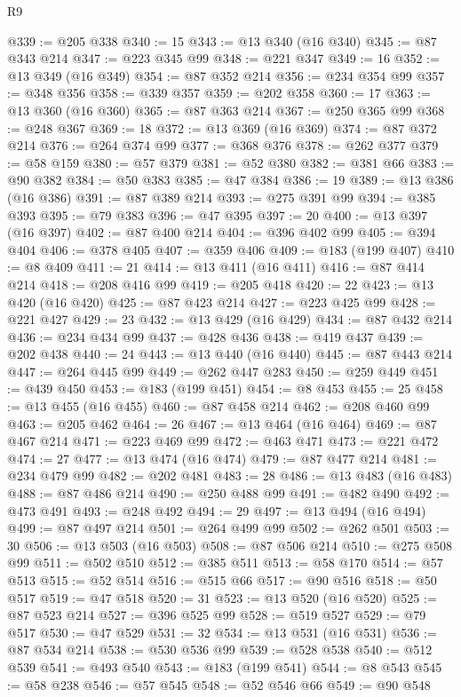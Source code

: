 \begin{lexlean}{R9}
\begin{coremodule}
@339 := @205 @338
@340 := 15
@343 := @13 @340 (@16 @340)
@345 := @87 @343 @214
@347 := @223 @345 @99
@348 := @221 @347
@349 := 16
@352 := @13 @349 (@16 @349)
@354 := @87 @352 @214
@356 := @234 @354 @99
@357 := @348 @356
@358 := @339 @357
@359 := @202 @358
@360 := 17
@363 := @13 @360 (@16 @360)
@365 := @87 @363 @214
@367 := @250 @365 @99
@368 := @248 @367
@369 := 18
@372 := @13 @369 (@16 @369)
@374 := @87 @372 @214
@376 := @264 @374 @99
@377 := @368 @376
@378 := @262 @377
@379 := @58 @159
@380 := @57 @379
@381 := @52 @380
@382 := @381 @66
@383 := @90 @382
@384 := @50 @383
@385 := @47 @384
@386 := 19
@389 := @13 @386 (@16 @386)
@391 := @87 @389 @214
@393 := @275 @391 @99
@394 := @385 @393
@395 := @79 @383
@396 := @47 @395
@397 := 20
@400 := @13 @397 (@16 @397)
@402 := @87 @400 @214
@404 := @396 @402 @99
@405 := @394 @404
@406 := @378 @405
@407 := @359 @406
@409 := @183 (@199 @407)
@410 := @8 @409
@411 := 21
@414 := @13 @411 (@16 @411)
@416 := @87 @414 @214
@418 := @208 @416 @99
@419 := @205 @418
@420 := 22
@423 := @13 @420 (@16 @420)
@425 := @87 @423 @214
@427 := @223 @425 @99
@428 := @221 @427
@429 := 23
@432 := @13 @429 (@16 @429)
@434 := @87 @432 @214
@436 := @234 @434 @99
@437 := @428 @436
@438 := @419 @437
@439 := @202 @438
@440 := 24
@443 := @13 @440 (@16 @440)
@445 := @87 @443 @214
@447 := @264 @445 @99
@449 := @262 @447 @283
@450 := @259 @449
@451 := @439 @450
@453 := @183 (@199 @451)
@454 := @8 @453
@455 := 25
@458 := @13 @455 (@16 @455)
@460 := @87 @458 @214
@462 := @208 @460 @99
@463 := @205 @462
@464 := 26
@467 := @13 @464 (@16 @464)
@469 := @87 @467 @214
@471 := @223 @469 @99
@472 := @463 @471
@473 := @221 @472
@474 := 27
@477 := @13 @474 (@16 @474)
@479 := @87 @477 @214
@481 := @234 @479 @99
@482 := @202 @481
@483 := 28
@486 := @13 @483 (@16 @483)
@488 := @87 @486 @214
@490 := @250 @488 @99
@491 := @482 @490
@492 := @473 @491
@493 := @248 @492
@494 := 29
@497 := @13 @494 (@16 @494)
@499 := @87 @497 @214
@501 := @264 @499 @99
@502 := @262 @501
@503 := 30
@506 := @13 @503 (@16 @503)
@508 := @87 @506 @214
@510 := @275 @508 @99
@511 := @502 @510
@512 := @385 @511
@513 := @58 @170
@514 := @57 @513
@515 := @52 @514
@516 := @515 @66
@517 := @90 @516
@518 := @50 @517
@519 := @47 @518
@520 := 31
@523 := @13 @520 (@16 @520)
@525 := @87 @523 @214
@527 := @396 @525 @99
@528 := @519 @527
@529 := @79 @517
@530 := @47 @529
@531 := 32
@534 := @13 @531 (@16 @531)
@536 := @87 @534 @214
@538 := @530 @536 @99
@539 := @528 @538
@540 := @512 @539
@541 := @493 @540
@543 := @183 (@199 @541)
@544 := @8 @543
@545 := @58 @238
@546 := @57 @545
@548 := @52 @546 @66
@549 := @90 @548

\end{coremodule}
\end{lexlean}
